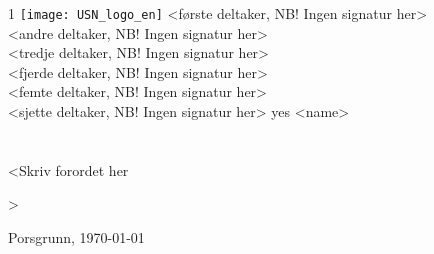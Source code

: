 \documentclass[%
norsk,     %
]{USN-BSc}
\begin{document}
\USNtitlepage%
{1}
{\vfill
  {}
   \texttt{[image: USN\_logo\_en]}}
{}  %
{%
<første deltaker, NB! Ingen signatur her>\\
<andre deltaker, NB! Ingen signatur her>\\
<tredje deltaker, NB! Ingen signatur her>\\
<fjerde deltaker, NB! Ingen signatur her>\\
<femte deltaker, NB! Ingen signatur her>\\
<sjette deltaker, NB! Ingen signatur her>
}
{yes} %
{<name>}
{%
\lipsum[6]
}
{%
\lipsum[7]
}

\chapter*{\USNpreface}
\label{sec:preface}
<Skriv forordet her

\lipsum[1]>

Porsgrunn, \today


\tableofcontents
{}

\listoffigures %
\end{document}
